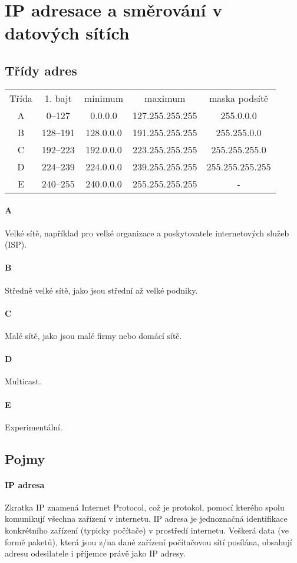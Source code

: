 \section{IP adresace a směrování v datových sítích}
\subsection{Třídy adres}
\begin{center}
\begin{tabular}{ |c|c|c|c|c| } 
 \hline
 Třída &	1. bajt & minimum & maximum & maska podsítě \\
 A & 0–127 & 0.0.0.0 & 127.255.255.255 & 255.0.0.0 \\
 B & 128–191 & 128.0.0.0 & 191.255.255.255 & 255.255.0.0 \\
 C & 192–223 & 192.0.0.0 & 223.255.255.255 & 255.255.255.0 \\
 D & 224–239 & 224.0.0.0 & 239.255.255.255 & 255.255.255.255 \\
 E & 240–255 & 240.0.0.0 & 255.255.255.255 & - \\
 \hline
\end{tabular}
\end{center}
\paragraph{A}
Velké sítě, například pro velké organizace a poskytovatele internetových služeb (ISP).
\paragraph{B}
Středně velké sítě, jako jsou střední až velké podniky.
\paragraph{C}
Malé sítě, jako jsou malé firmy nebo domácí sítě.
\paragraph{D}
Multicast.
\paragraph{E}
Experimentální.

\subsection{Pojmy}
\paragraph{IP adresa}
Zkratka IP znamená Internet Protocol, což je protokol, pomocí kterého spolu komunikují všechna zařízení v internetu. IP adresa je jednoznačná identifikace konkrétního zařízení (typicky počítače) v prostředí internetu. Veškerá data (ve formě paketů), která jsou z/na dané zařízení počítačovou sítí posílána, obsahují adresu odesilatele i příjemce právě jako IP adresy.
